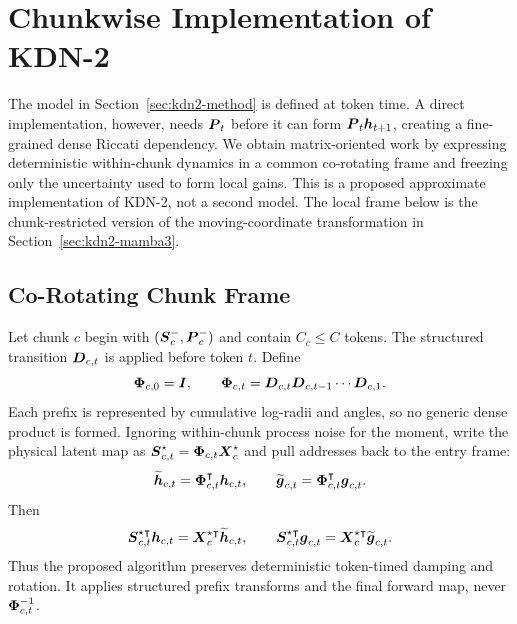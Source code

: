 \documentclass[11pt,letterpaper,logo]{yalearxiv}
\begin{document}
\section{Chunkwise Implementation of KDN-2}
\label{sec:kdn2-efficient}

The model in Section~\ref{sec:kdn2-method} is defined at token time. A direct implementation,
however, needs $\boldsymbol{P}_t$ before it can form $\boldsymbol{P}_t\boldsymbol{h}_{t+1}$, creating a fine-grained dense
Riccati dependency. We obtain matrix-oriented work by expressing deterministic within-chunk
dynamics in a common co-rotating frame and freezing only the uncertainty used to form local gains.
This is a proposed approximate implementation of KDN-2, not a second model.
The local frame below is the chunk-restricted version of the moving-coordinate transformation in
Section~\ref{sec:kdn2-mamba3}.

\subsection{Co-Rotating Chunk Frame}
\label{sec:kdn2-corotating-frame}

Let chunk $c$ begin with $(\boldsymbol{S}_c^-,\boldsymbol{P}_c^-)$ and contain $C_c\leq C$ tokens. The structured
transition $\boldsymbol{D}_{c,t}$ is applied before token $t$. Define
\begin{equation}
  \boldsymbol{\Phi}_{c,0}=\boldsymbol{I},
  \qquad
  \boldsymbol{\Phi}_{c,t}
  =
  \boldsymbol{D}_{c,t}\boldsymbol{D}_{c,t-1}\cdots\boldsymbol{D}_{c,1}.
  \label{eq:kdn2-prefix-transition}
\end{equation}
Each prefix is represented by cumulative log-radii and angles, so no generic dense product is
formed. Ignoring within-chunk process noise for the moment, write the physical latent map as
$\boldsymbol{S}_{c,t}^\star=\boldsymbol{\Phi}_{c,t}\boldsymbol{X}_c^\star$ and pull addresses back to the entry frame:
\begin{equation}
  \widetilde{\boldsymbol{h}}_{c,t}
  =
  \boldsymbol{\Phi}_{c,t}^{\intercal}\boldsymbol{h}_{c,t},
  \qquad
  \widetilde{\boldsymbol{g}}_{c,t}
  =
  \boldsymbol{\Phi}_{c,t}^{\intercal}\boldsymbol{g}_{c,t}.
  \label{eq:kdn2-transported-addresses}
\end{equation}
Then
\begin{equation}
  \boldsymbol{S}_{c,t}^{\star\intercal}\boldsymbol{h}_{c,t}
  =
  \boldsymbol{X}_c^{\star\intercal}\widetilde{\boldsymbol{h}}_{c,t},
  \qquad
  \boldsymbol{S}_{c,t}^{\star\intercal}\boldsymbol{g}_{c,t}
  =
  \boldsymbol{X}_c^{\star\intercal}\widetilde{\boldsymbol{g}}_{c,t}.
  \label{eq:kdn2-frame-identities}
\end{equation}
Thus the proposed algorithm preserves deterministic token-timed damping and rotation. It applies
structured prefix transforms and the final forward map, never $\boldsymbol{\Phi}_{c,t}^{-1}$.
\end{document}
